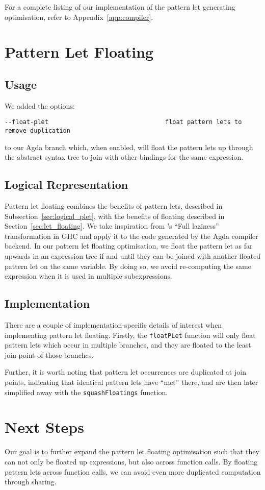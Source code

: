 For a complete listing of our implementation of the pattern let generating optimisation, refer to Appendix~\ref{app:compiler}.

\section{Pattern Let Floating}
\label{sec:plet-floating}

\subsection{Usage}

We added the options:

\begin{verbatim}
--float-plet                                float pattern lets to remove duplication
\end{verbatim}

to our Agda branch which, when enabled, will float the pattern lets up through the abstract syntax tree to join with other bindings for the same expression.

\subsection{Logical Representation}

Pattern let floating combines the benefits of pattern lets, described in Subsection~\ref{sec:logical_plet}, with the benefits of floating described in Section~\ref{sec:let_floating}. We take inspiration from \citet{jones1996}'s ``Full laziness'' transformation in GHC and apply it to the code generated by the Agda compiler backend. In our pattern let floating optimisation, we float the pattern let as far upwards in an expression tree if and until they can be joined with another floated pattern let on the same variable.  By doing so, we avoid re-computing the same expression when it is used in multiple subexpressions.

\subsection{Implementation}

There are a couple of implementation-specific details of interest when implementing pattern let floating. Firstly, the \lstinline{floatPLet} function will only float pattern lets which occur in multiple branches, and they are floated to the least join point of those branches.

Further, it is worth noting that pattern let occurrences are duplicated at join points, indicating that identical pattern lets have ``met'' there, and are then later simplified away with the \lstinline{squashFloatings} function.

\section{Next Steps}

Our goal is to further expand the pattern let floating optimisation such that they can not only be floated up expressions, but also across function calls. By floating pattern lets across function calls, we can avoid even more duplicated computation through sharing.
